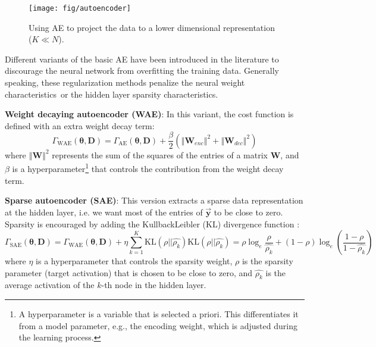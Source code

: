 \documentclass[a4paper,onecolumn,conference]{IEEEtran}
\begin{document}
\begin{figure}
\begin{centering}
\texttt{[image: fig/autoencoder]}
\par\end{centering}
\caption{\label{fig:basic_autoencoder}Using AE to project the data to a lower dimensional representation ($K\ll N$).}
\end{figure}

Different variants of the basic AE have been introduced in the literature to discourage the neural network from overfitting the training data. Generally speaking, these regularization methods penalize the neural weight characteristics~or the hidden layer sparsity characteristics.

\textbf{Weight decaying autoencoder (WAE)}: In this variant, the cost function is defined with an extra weight decay term:
\begin{equation}
\Gamma_{\text{WAE}}\left(\boldsymbol{\theta},\mathbf{D}\right)= \Gamma_{\text{AE}}\left(\boldsymbol{\theta},\mathbf{D}\right)+
\frac{\beta}{2}\left( \left\Vert \mathbf{W}_{enc} \right\Vert^2 +  \left\Vert \mathbf{W}_{dec} \right\Vert^2 \right)
\end{equation}
where $\left\Vert \mathbf{W} \right\Vert^2$ represents the sum of the squares of the entries of a matrix $\mathbf{W}$, and $\beta$ is a hyperparameter\footnote{A hyperparameter is a variable that is selected a priori. This differentiates
it from a model parameter, e.g., the encoding weight, which is adjusted during the learning process.} 
that controls the contribution from the weight decay term.

\textbf{Sparse autoencoder (SAE)}: This version extracts a sparse data representation at the hidden layer, i.e. we want most of the entries of $\vec{\mathbf{y}}$ to be close to zero. Sparsity is encouraged by adding the Kullback\textendash{}Leibler (KL) divergence function \cite{ng2011sparse}:
\begin{subequations}
\begin{equation}
\Gamma_{\text{SAE}}\left(\boldsymbol{\theta},\mathbf{D}\right)=\Gamma_{\text{WAE}}\left(\boldsymbol{\theta},\mathbf{D}\right)+\eta\sum_{k=1}^{K}\text{KL}(\rho||\hat{\rho_{k}})
\end{equation}
\begin{equation}
\text{KL}(\rho||\hat{\rho_{k}})=\rho\log_{e}\frac{\rho}{\hat{\rho_{k}}}+\left(1-\rho\right)\log_{e}\left(\frac{1-\rho}{1-\hat{\rho_{k}}}\right)
\end{equation}
\end{subequations}
where $\eta$ is a hyperparameter that controls the sparsity weight, $\rho$ is the sparsity parameter (target activation) that is chosen to be close to zero, and $\hat{\rho_{k}}$ is the average activation of the $k$-th node in the hidden layer.
\end{document}
